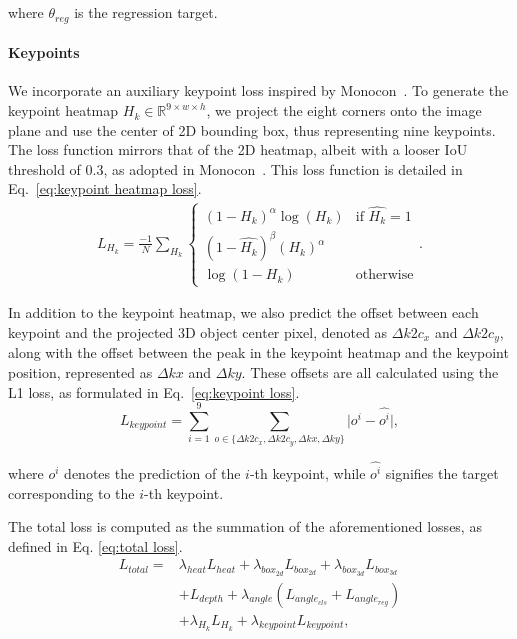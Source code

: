 \documentclass[journal]{IEEEtran}
\newcommand{\R}{\mathbb{R}}
\begin{document}
	where $\hat{\theta_{reg}}$ is the regression target.
	
	\paragraph{Keypoints}
	We incorporate an auxiliary keypoint loss inspired by Monocon~\cite{monocon}. To generate the keypoint heatmap $H_k \in \R^{9 \times w \times h}$, we project the eight corners onto the image plane and use the center of 2D bounding box, thus representing nine keypoints. The loss function mirrors that of the 2D heatmap, albeit with a looser IoU threshold of 0.3, as adopted in Monocon~\cite{monocon}. This loss function is detailed in Eq.~\eqref{eq:keypoint heatmap loss}.
	\begin{equation}
		\begin{split}
			L_{H_k}=\frac{-1}N\sum_{H_k}\begin{cases}(1-H_k)^\alpha\log(H_k)&\text{if }\hat{H_k}=1\\(1-\hat{H_k})^\beta({H_k})^\alpha \\ \log(1-{H_k}) &\text{otherwise}\end{cases}.
			\label{eq:keypoint heatmap loss}
		\end{split}
	\end{equation}
	
	In addition to the keypoint heatmap, we also predict the offset between each keypoint and the projected 3D object center pixel, denoted as $\Delta k2c_x$ and $\Delta k2c_y$, along with the offset between the peak in the keypoint heatmap and the keypoint position, represented as $\Delta kx$ and $\Delta ky$. These offsets are all calculated using the L1 loss, as formulated in Eq.~\eqref{eq:keypoint loss}.
	\begin{equation}
		L_{keypoint} = \sum_{i=1}^{9}\sum_{o\in \{\Delta k2c_x, \Delta k2c_y, \Delta kx, \Delta ky\}}\lvert o^i - \hat{o^i} \rvert, 
		\label{eq:keypoint loss}
	\end{equation}
	
	where $o^i$ denotes the prediction of the $i$-th keypoint, while $\hat{o^i}$ signifies the target corresponding to the $i$-th keypoint.
	
	The total loss is computed as the summation of the aforementioned losses, as defined in Eq. \eqref{eq:total loss}.
	\begin{equation}
		\begin{aligned}
			L_{total} =& \lambda_{heat}L_{heat} + \lambda_{box_{2d}}L_{box_{2d}} + \lambda_{box_{3d}}L_{box_{3d}}\\ 
			&+ L_{depth} +\lambda_{angle}(L_{angle_{cls}} + L_{angle_{reg}})\\ 
			&+ \lambda_{H_k}L_{H_k} + \lambda_{keypoint}L_{keypoint}, 
			\label{eq:total loss}
		\end{aligned}
	\end{equation}
	
\end{document}
